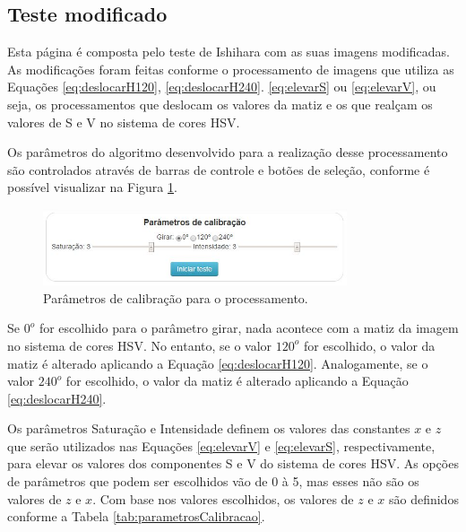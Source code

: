 \documentclass[	12pt, Times, openright, twoside, a4paper, english, brazil]{abntex2}
\begin{document}
\subsection{Teste modificado}
\label{subsec:testeModificado}

Esta página é composta pelo teste de Ishihara com as suas imagens modificadas. As modificações foram feitas conforme o processamento de imagens que utiliza as Equações \ref{eq:deslocarH120}, \ref{eq:deslocarH240}. \ref{eq:elevarS} ou \ref{eq:elevarV}, ou seja, os processamentos que deslocam os valores da matiz e os que realçam os valores de S e V no sistema de cores HSV.

Os parâmetros do algoritmo desenvolvido para a realização desse processamento são controlados através de barras de controle e botões de seleção, conforme é possível visualizar na Figura \ref{fig:figuraParametrosTeste}. 

\begin{figure}[!htb]
\centering \includegraphics[width=0.8\textwidth]{figuraParametrosCalibracao.jpg}
\caption{Parâmetros de calibração para o processamento.} \label{fig:figuraParametrosTeste}
\end{figure}

Se $0^o$ for escolhido para o parâmetro girar, nada acontece com a matiz da imagem no sistema de cores HSV. No entanto, se o valor $120^o$ for escolhido, o valor da matiz é alterado aplicando a Equação \ref{eq:deslocarH120}. Analogamente, se o valor $240^o$ for escolhido, o valor da matiz é alterado aplicando a Equação \ref{eq:deslocarH240}.

Os parâmetros Saturação e Intensidade definem os valores das constantes $x$ e $z$ que serão utilizados nas Equações \ref{eq:elevarV} e \ref{eq:elevarS}, respectivamente, para elevar os valores dos componentes S e V do sistema de cores HSV. As opções de parâmetros que podem ser escolhidos vão de 0 à 5, mas esses não são os valores de $z$ e $x$. Com base nos valores escolhidos, os valores de $z$ e $x$ são definidos conforme a Tabela \ref{tab:parametrosCalibracao}.
\end{document}
